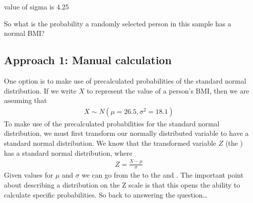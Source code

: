 \documentclass[letterpaper,10pt,english]{jupyterBook}
\begin{document}
\begin{sphinxVerbatim}[commandchars=\\\{\}]
[1] \PYGZdq{}value of sigma is 4.25\PYGZdq{}
\end{sphinxVerbatim}

\sphinxAtStartPar
So what is the probability a randomly selected person in this sample has a normal BMI?


\subsection{Approach 1: Manual calculation}
\label{\detokenize{03.d. Continuous Probability Distributions:approach-1-manual-calculation}}
\sphinxAtStartPar
One option is to make use of pre\sphinxhyphen{}calculated probabilities of the standard normal distribution. If we write \(X\) to represent the value of a person’s BMI, then we are assuming that
\begin{equation*}
\begin{split}
X \sim N(\mu=26.5, \sigma^2=18.1)
\end{split}
\end{equation*}
\sphinxAtStartPar
To make use of the pre\sphinxhyphen{}calculated probabilities for the standard normal distribution, we must first transform our normally distributed variable to have a standard normal distribution. We know that the transformed variable \(Z\) (the ) has a standard normal distribution, where
\begin{equation*}
\begin{split}
Z = \frac{X - \mu}{\sigma}
\end{split}
\end{equation*}
\sphinxAtStartPar
Given values for \(\mu\) and \(\sigma\) we can go from the  to the  and . The important point about describing a distribution on the Z scale is that this opens the ability to calculate specific probabilities. So back to answering the question…
\end{document}
